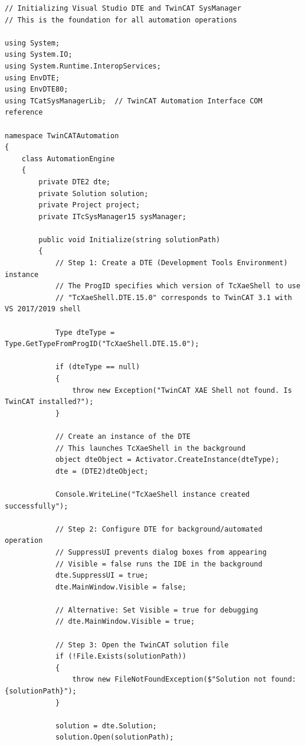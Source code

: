 \documentclass[11pt,a4paper]{article}
\begin{document}
\begin{lstlisting}[style=csharpstyle]
// Initializing Visual Studio DTE and TwinCAT SysManager
// This is the foundation for all automation operations

using System;
using System.IO;
using System.Runtime.InteropServices;
using EnvDTE;
using EnvDTE80;
using TCatSysManagerLib;  // TwinCAT Automation Interface COM reference

namespace TwinCATAutomation
{
    class AutomationEngine
    {
        private DTE2 dte;
        private Solution solution;
        private Project project;
        private ITcSysManager15 sysManager;
        
        public void Initialize(string solutionPath)
        {
            // Step 1: Create a DTE (Development Tools Environment) instance
            // The ProgID specifies which version of TcXaeShell to use
            // "TcXaeShell.DTE.15.0" corresponds to TwinCAT 3.1 with VS 2017/2019 shell
            
            Type dteType = Type.GetTypeFromProgID("TcXaeShell.DTE.15.0");
            
            if (dteType == null)
            {
                throw new Exception("TwinCAT XAE Shell not found. Is TwinCAT installed?");
            }
            
            // Create an instance of the DTE
            // This launches TcXaeShell in the background
            object dteObject = Activator.CreateInstance(dteType);
            dte = (DTE2)dteObject;
            
            Console.WriteLine("TcXaeShell instance created successfully");
            
            // Step 2: Configure DTE for background/automated operation
            // SuppressUI prevents dialog boxes from appearing
            // Visible = false runs the IDE in the background
            dte.SuppressUI = true;
            dte.MainWindow.Visible = false;
            
            // Alternative: Set Visible = true for debugging
            // dte.MainWindow.Visible = true;
            
            // Step 3: Open the TwinCAT solution file
            if (!File.Exists(solutionPath))
            {
                throw new FileNotFoundException($"Solution not found: {solutionPath}");
            }
            
            solution = dte.Solution;
            solution.Open(solutionPath);
            

\end{lstlisting}
\end{document}
